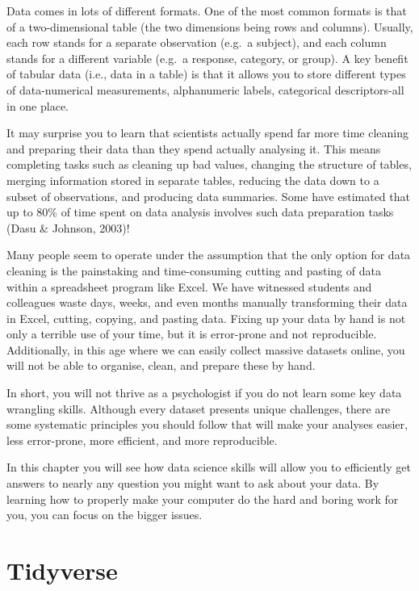 \documentclass[
  oneside]{book}
\begin{document}
Data comes in lots of different formats. One of the most common formats is that of a two-dimensional table (the two dimensions being rows and columns). Usually, each row stands for a separate observation (e.g.~a subject), and each column stands for a different variable (e.g.~a response, category, or group). A key benefit of tabular data (i.e., data in a table) is that it allows you to store different types of data-numerical measurements, alphanumeric labels, categorical descriptors-all in one place.

It may surprise you to learn that scientists actually spend far more time cleaning and preparing their data than they spend actually analysing it. This means completing tasks such as cleaning up bad values, changing the structure of tables, merging information stored in separate tables, reducing the data down to a subset of observations, and producing data summaries. Some have estimated that up to 80\% of time spent on data analysis involves such data preparation tasks (Dasu \& Johnson, 2003)!

Many people seem to operate under the assumption that the only option for data cleaning is the painstaking and time-consuming cutting and pasting of data within a spreadsheet program like Excel. We have witnessed students and colleagues waste days, weeks, and even months manually transforming their data in Excel, cutting, copying, and pasting data. Fixing up your data by hand is not only a terrible use of your time, but it is error-prone and not reproducible. Additionally, in this age where we can easily collect massive datasets online, you will not be able to organise, clean, and prepare these by hand.

In short, you will not thrive as a psychologist if you do not learn some key data wrangling skills. Although every dataset presents unique challenges, there are some systematic principles you should follow that will make your analyses easier, less error-prone, more efficient, and more reproducible.

In this chapter you will see how data science skills will allow you to efficiently get answers to nearly any question you might want to ask about your data. By learning how to properly make your computer do the hard and boring work for you, you can focus on the bigger issues.

\hypertarget{tidyverse}{%
\section{Tidyverse}\label{tidyverse}}
\end{document}

